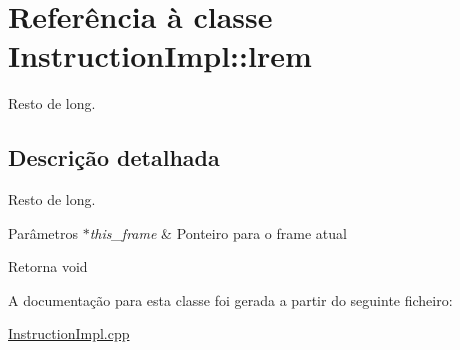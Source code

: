 \hypertarget{class_instruction_impl_1_1lrem}{}\section{Referência à classe Instruction\+Impl\+:\+:lrem}
\label{class_instruction_impl_1_1lrem}


Resto de long.  




\subsection{Descrição detalhada}
Resto de long. 


\begin{DoxyParams}{Parâmetros}
{\em $\ast$this\+\_\+frame} & Ponteiro para o frame atual \\
\hline
\end{DoxyParams}
\begin{DoxyReturn}{Retorna}
void 
\end{DoxyReturn}


A documentação para esta classe foi gerada a partir do seguinte ficheiro\+:\begin{DoxyCompactItemize}
\item 
\hyperlink{_instruction_impl_8cpp}{Instruction\+Impl.\+cpp}\end{DoxyCompactItemize}
